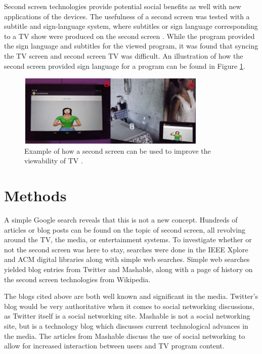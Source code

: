 \documentclass[11pt, oneside]{article}
\begin{document}
Second screen technologies provide potential social benefits as well with new applications of the devices. The usefulness of a second screen was tested with a subtitle and sign-language system, where subtitles or sign language corresponding to a TV show were produced on the second screen \cite{IEEE_EFS}. While the program provided the sign language and subtitles for the viewed program, it was found that syncing the TV screen and second screen TV was difficult. An illustration of how the second screen provided sign language for a program can be found in Figure \ref{sign-language}.

\begin{figure}
    \centering
    \includegraphics[width=.8\textwidth]{SignLanguage.png}
    \caption{Example of how a second screen can be used to improve the viewability of TV \cite{IEEE_EFS}.}
    \label{sign-language}
\end{figure}

\section{Methods}
A simple Google search reveals that this is not a new concept. Hundreds of articles or blog posts can be found on the topic of second screen, all revolving around the TV, the media, or entertainment systems. To investigate whether or not the second screen was here to stay, searches were done in the IEEE Xplore and ACM digital libraries along with simple web searches. Simple web searches yielded blog entries from Twitter and Mashable, along with a page of history on the second screen technologies from Wikipedia.

The blogs cited above are both well known and significant in the media. Twitter's blog would be very authoritative when it comes to social networking discussions, as Twitter itself is a social networking site. Mashable is not a social networking site, but is a technology blog which discusses current technological advances in the media. The articles from Mashable discuss the use of social networking to allow for increased interaction between users and TV program content. 
\end{document}
